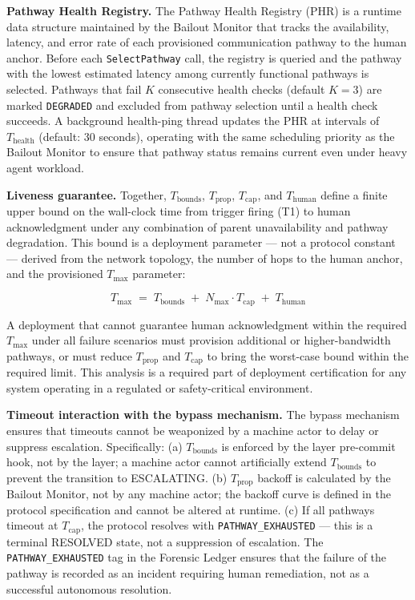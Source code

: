 \medskip
\noindent\textbf{Pathway Health Registry.} The Pathway Health Registry (PHR) is a runtime data structure maintained by the Bailout Monitor that tracks the availability, latency, and error rate of each provisioned communication pathway to the human anchor. Before each \texttt{SelectPathway} call, the registry is queried and the pathway with the lowest estimated latency among currently functional pathways is selected. Pathways that fail $K$ consecutive health checks (default $K = 3$) are marked \texttt{DEGRADED} and excluded from pathway selection until a health check succeeds. A background health-ping thread updates the PHR at intervals of $T_{\text{health}}$ (default: 30 seconds), operating with the same scheduling priority as the Bailout Monitor to ensure that pathway status remains current even under heavy agent workload.

\medskip
\noindent\textbf{Liveness guarantee.} Together, $T_{\text{bounds}}$, $T_{\text{prop}}$, $T_{\text{cap}}$, and $T_{\text{human}}$ define a finite upper bound on the wall-clock time from trigger firing (T1) to human acknowledgment under any combination of parent unavailability and pathway degradation. This bound is a deployment parameter — not a protocol constant — derived from the network topology, the number of hops to the human anchor, and the provisioned $T_{\max}$ parameter:

\begin{equation}
T_{\max} \;=\; T_{\text{bounds}} \;+\; N_{\max} \cdot T_{\text{cap}} \;+\; T_{\text{human}} \tag{T-max}
\end{equation}

A deployment that cannot guarantee human acknowledgment within the required $T_{\max}$ under all failure scenarios must provision additional or higher-bandwidth pathways, or must reduce $T_{\text{prop}}$ and $T_{\text{cap}}$ to bring the worst-case bound within the required limit. This analysis is a required part of deployment certification for any \bxthree{} system operating in a regulated or safety-critical environment.

\medskip
\noindent\textbf{Timeout interaction with the bypass mechanism.} The bypass mechanism ensures that timeouts cannot be weaponized by a machine actor to delay or suppress escalation. Specifically: (a) $T_{\text{bounds}}$ is enforced by the \fact{} layer pre-commit hook, not by the \bounds{} layer; a machine actor cannot artificially extend $T_{\text{bounds}}$ to prevent the transition to ESCALATING. (b) $T_{\text{prop}}$ backoff is calculated by the Bailout Monitor, not by any machine actor; the backoff curve is defined in the protocol specification and cannot be altered at runtime. (c) If all pathways timeout at $T_{\text{cap}}$, the protocol resolves with \texttt{PATHWAY\_EXHAUSTED} — this is a terminal RESOLVED state, not a suppression of escalation. The \texttt{PATHWAY\_EXHAUSTED} tag in the Forensic Ledger ensures that the failure of the pathway is recorded as an incident requiring human remediation, not as a successful autonomous resolution.